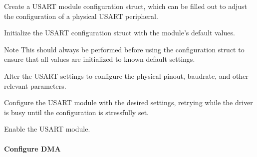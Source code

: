 \begin{DoxyEnumerate}
\item Create a U\+S\+A\+R\+T module configuration struct, which can be filled out to adjust the configuration of a physical U\+S\+A\+R\+T peripheral. 
\begin{DoxyCodeInclude}
\end{DoxyCodeInclude}

\item Initialize the U\+S\+A\+R\+T configuration struct with the module's default values. 
\begin{DoxyCodeInclude}
\end{DoxyCodeInclude}
 \begin{DoxyNote}{Note}
This should always be performed before using the configuration struct to ensure that all values are initialized to known default settings.
\end{DoxyNote}

\item Alter the U\+S\+A\+R\+T settings to configure the physical pinout, baudrate, and other relevant parameters. 
\begin{DoxyCodeInclude}
\end{DoxyCodeInclude}

\item Configure the U\+S\+A\+R\+T module with the desired settings, retrying while the driver is busy until the configuration is stressfully set. 
\begin{DoxyCodeInclude}
\end{DoxyCodeInclude}

\item Enable the U\+S\+A\+R\+T module. 
\begin{DoxyCodeInclude}
\end{DoxyCodeInclude}
 
\end{DoxyEnumerate}\hypertarget{asfdoc_sam0_sercom_usart_dma_use_case_asfdoc_sam0_usart_dma_use_case_setup_flow_dma}{}\paragraph{Configure D\+M\+A}\label{asfdoc_sam0_sercom_usart_dma_use_case_asfdoc_sam0_usart_dma_use_case_setup_flow_dma}

